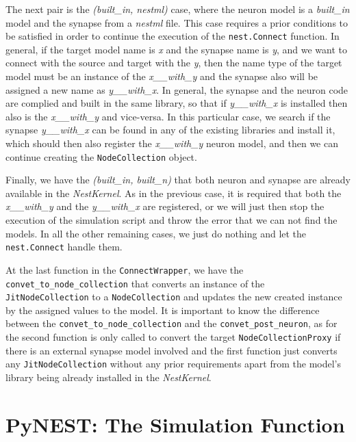 The next pair is the \emph{(built\_in, nestml)} case, where the neuron model is a \emph{built\_in} model and the synapse from a \emph{nestml} file. This case requires a prior conditions to be satisfied in order to continue the execution of the \texttt{nest.Connect} function. In general, if the target model name is \emph{x} and the synapse name is \emph{y}, and we want to connect with the source and target with the \emph{y}, then the name type of the target model must be an instance of the \emph{x\_\_with\_y} and the synapse also will be assigned a new name as \emph{y\_\_with\_x}. In general, the synapse and the neuron code are complied and built in the same library, so that if \emph{y\_\_with\_x} is installed then also is the \emph{x\_\_with\_y} and vice-versa. In this particular case, we search if the  synapse \emph{y\_\_with\_x} can be found in any of the existing libraries and install it, which should then also register the \emph{x\_\_with\_y} neuron model, and then we can continue creating the \texttt{NodeCollection} object.


Finally, we have the \emph{(built\_in, built\_n)} that both neuron and synapse are already available in the \emph{NestKernel}. As in the previous case, it is required that both the \emph{x\_\_with\_y} and the \emph{y\_\_with\_x} are registered, or we will just then stop the execution of the simulation script and throw the error that we can not find the models. In all the other remaining cases, we just do nothing and let the \texttt{nest.Connect} handle them.


At the last function in the \texttt{ConnectWrapper}, we have the \texttt{convet\_to\_node\_collection} that converts an instance of the \texttt{JitNodeCollection} to a \texttt{NodeCollection} and updates the new created instance by the assigned values to the model. It is important to know the difference between the \texttt{convet\_to\_node\_collection} and the \texttt{convet\_post\_neuron}, as for the second function is only called to convert the target \texttt{NodeCollectionProxy} if there is an external synapse model involved and the first function just converts any \texttt{JitNodeCollection} without any prior requirements apart from the model's library being already installed in the \emph{NestKernel}.
   
\section{PyNEST: The Simulation Function}
   
